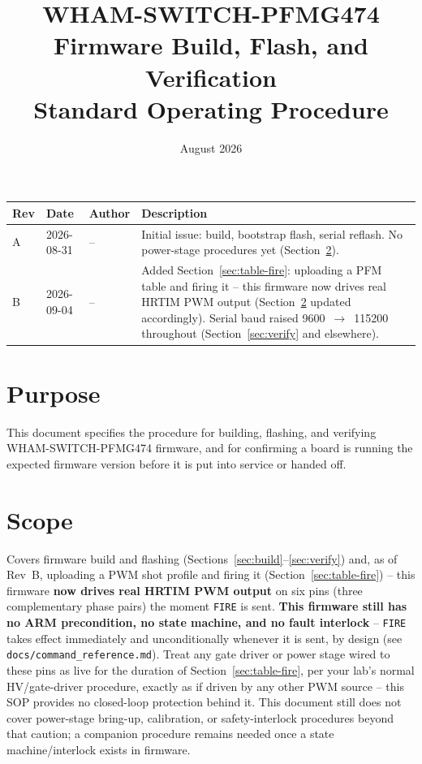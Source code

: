 \documentclass[11pt]{article}
\title{WHAM-SWITCH-PFMG474\\ \large Firmware Build, Flash, and Verification \\ Standard Operating Procedure}
\author{}
\date{August 2026}
\newcommand{\code}[1]{\texttt{#1}}
\begin{document}
\maketitle

\begin{center}
\begin{tabular}{p{0.45in} p{0.75in} p{0.5in} p{2.7in}}
  \hline
  \textbf{Rev} & \textbf{Date} & \textbf{Author} & \textbf{Description} \\
  \hline
  A & 2026-08-31 & -- & Initial issue: build, bootstrap flash, serial
    reflash. No power-stage procedures yet (Section~\ref{sec:scope}). \\
  B & 2026-09-04 & -- & Added Section~\ref{sec:table-fire}: uploading a
    PFM table and firing it -- this firmware now drives real HRTIM PWM
    output (Section~\ref{sec:scope} updated accordingly). Serial baud
    raised 9600~$\to$~115200 throughout (Section~\ref{sec:verify} and
    elsewhere). \\
  \hline
\end{tabular}
\end{center}

\section{Purpose}

This document specifies the procedure for building, flashing, and
verifying WHAM-SWITCH-PFMG474 firmware, and for confirming a board is
running the expected firmware version before it is put into service or
handed off.

\section{Scope}
\label{sec:scope}

Covers firmware build and flashing (Sections~\ref{sec:build}--\ref{sec:verify})
and, as of Rev~B, uploading a PWM shot profile and firing it
(Section~\ref{sec:table-fire}) -- this firmware \textbf{now drives real
HRTIM PWM output} on six pins (three complementary phase pairs) the
moment \code{FIRE} is sent. \textbf{This firmware still has no ARM
precondition, no state machine, and no fault interlock} -- \code{FIRE}
takes effect immediately and unconditionally whenever it is sent, by
design (see \code{docs/command\_reference.md}). Treat any gate driver or
power stage wired to these pins as live for the duration of
Section~\ref{sec:table-fire}, per your lab's normal HV/gate-driver
procedure, exactly as if driven by any other PWM source -- this SOP
provides no closed-loop protection behind it. This document still does
not cover power-stage bring-up, calibration, or safety-interlock
procedures beyond that caution; a companion procedure remains needed
once a state machine/interlock exists in firmware.
\end{document}

